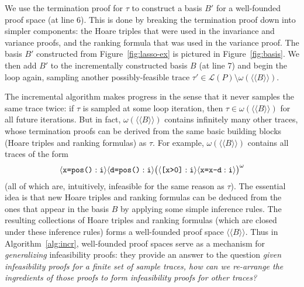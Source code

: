 \documentclass[9pt,nocopyrightspace]{sigplanconf}
\theoremstyle{definition}
\newcommand{\tuple}[1]{\langle #1 \rangle}
\newcommand{\closure}[1]{\langle\!\langle#1\rangle\!\rangle}
\newcommand{\idx}[1]{\text{\rm\texttt{#1}}}
\newcommand{\ic}[2]{{\tuple{#1 : #2}}}
\newcommand{\lang}{\mathcal{L}}
\begin{document}
We use the termination proof for $\tau$ to construct a basis $B'$ for a
well-founded proof space (at line 6).  This is done by breaking the
termination proof down into simpler components: the Hoare triples that were
used in the invariance and variance proofs, and the ranking formula that was
used in the variance proof.  The basis $B'$ constructed from
Figure~\ref{fig:lasso-ex} is pictured in Figure~\ref{fig:basis}.  We then add
$B'$ to the incrementally constructed basis $B$ (at line 7) and begin the loop again,
sampling another possibly-feasible trace \mbox{$\tau' \in \lang(P) \setminus
\omega(\closure{B})$}.

The incremental algorithm makes progress in the sense that it never samples
the same trace twice: if $\tau$ is sampled at some loop iteration, then $\tau
\in \omega(\closure{B})$ for all future iterations.  But in fact,
$\omega(\closure{B})$ contains infinitely many other traces, whose termination
proofs can be derived from the same basic building blocks (Hoare triples and
ranking formulas) as $\tau$.  For example, $\omega(\closure{B})$
contains all traces of the form
\[\ic{\texttt{x=pos()}}{\idx{i}}\ic{\texttt{d=pos()}}{\idx{i}}\big(\ic{\texttt{[x>0]}}{\idx{i}}\ic{\texttt{x=x-d}}{\idx{i}}\big)^\omega \]
(all of which are, intuitively, infeasible for the same reason as $\tau$).
The essential idea is that new Hoare triples and ranking formulas can
be deduced from the ones that appear in the basis $B$ by applying some simple
inference rules.  The resulting collections of Hoare triples and ranking
formulas (which are closed under these inference rules) forms a well-founded
proof space $\closure{B}$.  Thus in Algorithm~\ref{alg:incr}, well-founded
proof spaces serve as a mechanism for \emph{generalizing} infeasibility
proofs: they provide an answer to the question \emph{given infeasibility
  proofs for a finite set of sample traces, how can we re-arrange the
  ingredients of those proofs to form infeasibility proofs for other traces?}
\end{document}
